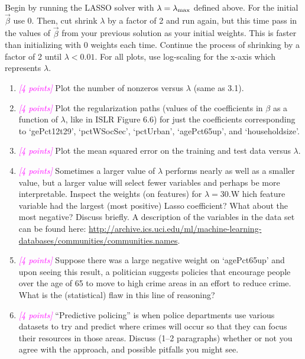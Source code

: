 \documentclass{article}
\newcommand{\points}[1]{\small\textcolor{magenta}{\emph{[#1 points]}} \normalsize}
\begin{document}
\vspace{1em}
Begin by running the LASSO solver with
$\lambda = \lambda_{\rm max}$
defined above.  
For the initial $\vec \beta$ use 0.  
Then, cut shrink $\lambda$ by a factor of 2 and run again, 
but this time pass in the values of $\vec \beta$ from your previous solution as 
your initial weights.  
This is faster than initializing with 0 weights each time.  
Continue the process of shrinking by a factor of 2 until $\lambda< 0.01$.
For all plots, use log-scaling for the x-axis which represents $\lambda$.
\begin{enumerate}
\item \points{4} Plot the number of nonzeros versus $\lambda$ (same as 3.1).
\item \points{4} Plot the regularization paths (values of the coefficients in $\beta$
  as a function of $\lambda$, like in ISLR Figure 6.6) for just the coefficients
  corresponding to `gePct12t29', `pctWSocSec', `pctUrban', `agePct65up', and `householdsize'.
\item \points{4} Plot the mean squared error on the training and test data versus $\lambda$.
\item \points{4} Sometimes a larger value of $\lambda$ performs nearly as well 
  as a smaller value, but a larger value will select fewer variables 
  and perhaps be more interpretable.  
  Inspect the weights (on features) for $\lambda= 30$.W
  hich feature variable had the largest (most positive) Lasso coefficient?  
  What about the most negative?
  Discuss briefly.  
  A description of the variables in the data set can be found here:
  \url{http://archive.ics.uci.edu/ml/machine-learning-databases/communities/communities.names}.
\item \points{4} Suppose there was a large negative weight on `agePct65up'
  and upon seeing this result, a politician suggests policies that encourage 
  people over the age of 65 to move to high crime areas in an effort to reduce crime.
  What is the (statistical) flaw in this line of reasoning?
\item \points{4} ``Predictive policing'' is when police departments use various
  datasets to try and predict where crimes will occur so that they can focus their
  resources in those areas. Discuss (1--2 paragraphs) whether or not you
  agree with the approach, and possible pitfalls you might see.
\end{enumerate}
\end{document}
